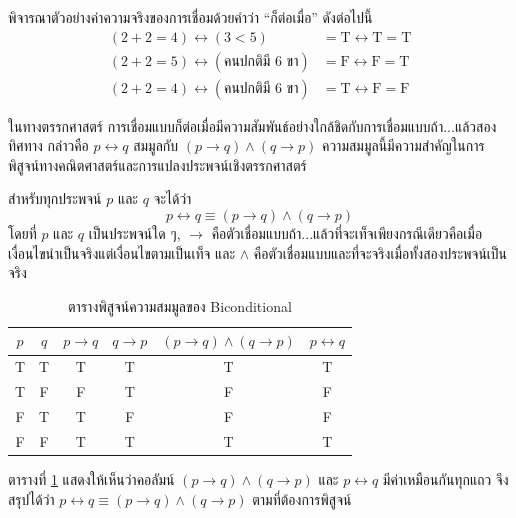 \bigskip

\noindent พิจารณาตัวอย่างค่าความจริงของการเชื่อมด้วยคำว่า ``ก็ต่อเมื่อ'' ดังต่อไปนี้
\begin{align*}
(2+2=4) \leftrightarrow (3<5) &= \text{T} \leftrightarrow \text{T} = \text{T}\\
(2+2=5) \leftrightarrow (\text{คนปกติมี 6 ขา}) &= \text{F} \leftrightarrow \text{F} = \text{T}\\
(2+2=4) \leftrightarrow (\text{คนปกติมี 6 ขา}) &= \text{T} \leftrightarrow \text{F} = \text{F}
\end{align*}

\noindent ในทางตรรกศาสตร์ การเชื่อมแบบก็ต่อเมื่อมีความสัมพันธ์อย่างใกล้ชิดกับการเชื่อมแบบถ้า...แล้วสองทิศทาง กล่าวคือ $p \leftrightarrow q$ สมมูลกับ $(p \rightarrow q) \land (q \rightarrow p)$ ความสมมูลนี้มีความสำคัญในการพิสูจน์ทางคณิตศาสตร์และการแปลงประพจน์เชิงตรรกศาสตร์

\begin{prop}
สำหรับทุกประพจน์ $p$ และ $q$ จะได้ว่า
\begin{equation}
p \leftrightarrow q \equiv (p \rightarrow q) \land (q \rightarrow p)
\end{equation}
โดยที่ $p$ และ $q$ เป็นประพจน์ใด ๆ, $\rightarrow$ คือตัวเชื่อมแบบถ้า...แล้วที่จะเท็จเพียงกรณีเดียวคือเมื่อเงื่อนไขนำเป็นจริงแต่เงื่อนไขตามเป็นเท็จ และ $\land$ คือตัวเชื่อมแบบและที่จะจริงเมื่อทั้งสองประพจน์เป็นจริง
\end{prop}

\begin{table}[H]
    \centering
    \caption{ตารางพิสูจน์ความสมมูลของ Biconditional}
    \label{tab:biconditional-equiv}
    \begin{tabular}{|c|c|c|c|c|c|}
        \hline
        \textbf{$p$} & \textbf{$q$} & \textbf{$p \rightarrow q$} & \textbf{$q \rightarrow p$} & \textbf{$(p \rightarrow q) \land (q \rightarrow p)$} & \textbf{$p \leftrightarrow q$} \\ \hline
        T & T & T & T & T & T \\ \hline
        T & F & F & T & F & F \\ \hline
        F & T & T & F & F & F \\ \hline
        F & F & T & T & T & T \\ \hline
    \end{tabular}
\end{table}

ตารางที่ \ref{tab:biconditional-equiv} แสดงให้เห็นว่าคอลัมน์ $(p \rightarrow q) \land (q \rightarrow p)$ และ $p \leftrightarrow q$ มีค่าเหมือนกันทุกแถว จึงสรุปได้ว่า $p \leftrightarrow q \equiv (p \rightarrow q) \land (q \rightarrow p)$ ตามที่ต้องการพิสูจน์

